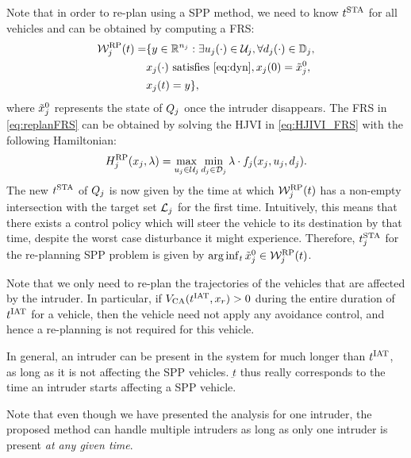 Note that in order to re-plan using a SPP method, we need to know $t^\text{STA}$ for all vehicles and can be obtained by computing a FRS:
\begin{equation} \label{eq:replanFRS}
\begin{aligned} 
\frs_j^{\text{RP}}(t) = & \{y \in \R^{n_j}: \exists \ctrl_j(\cdot) \in \cset_j, \forall \dstb_j(\cdot) \in \dfset_j, \\
& \state_j(\cdot) \text{ satisfies \eqref{eq:dyn}}, \state_j(0) = \tilde{\state}_j^0, \\
& \state_j(t) = y\},
\end{aligned}
\end{equation}
where $\tilde{x}_j^0$ represents the state of $Q_j$ once the intruder disappears. The FRS in \eqref{eq:replanFRS} can be obtained by solving the HJVI in \eqref{eq:HJIVI_FRS} with the following Hamiltonian:
\begin{equation}
H_j^{\text{RP}}(x_j, \lambda) = \max_{u_j \in \mathcal{U}_j} \min_{d_j \in \mathcal{D}_j} \lambda \cdot f_j (x_j, u_j, d_j). 
\end{equation} 
The new $t^\text{STA}$ of $Q_j$ is now given by the time at which $\mathcal{W}_j^{\text{RP}}(t)$ has a non-empty intersection with the target set $\mathcal{L}_j$ for the first time. Intuitively, this means that there exists a control policy which will steer the vehicle to its destination by that time, despite the worst case disturbance it might experience. Therefore, $t^\text{STA}_j$ for the re-planning SPP problem is given by $\arg \inf_t \tilde{x}_j^0 \in \mathcal{W}_j^{\text{RP}}(t)$.

\begin{remark}
Note that we only need to re-plan the trajectories of the vehicles that are affected by the intruder. In particular, if $V_\text{CA}(t^\text{IAT}, x_r) > 0$ during the entire duration of $t^\text{IAT}$ for a vehicle, then the vehicle need not apply any avoidance control, and hence a re-planning is not required for this vehicle. 
\end{remark}

\begin{remark}
In general, an intruder can be present in the system for much longer than $t^\text{IAT}$, as long as it is not affecting the SPP vehicles. $\underbar{t}$ thus really corresponds to the time an intruder starts affecting a SPP vehicle.
\end{remark}

\begin{remark}
Note that even though we have presented the analysis for one intruder, the proposed method can handle multiple intruders as long as only one intruder is present \textit{at any given time}. 
\end{remark}

